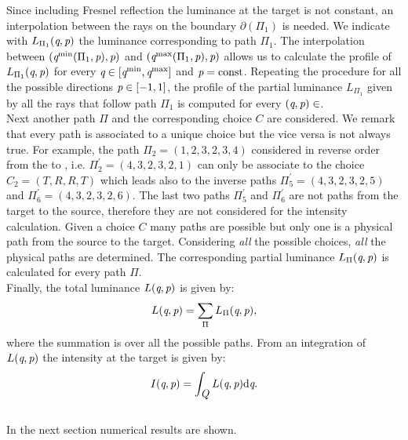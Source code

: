 Since including Fresnel reflection the luminance at the target is not constant, an interpolation between the rays on the boundary $\partial$$(\Pi_1)$ is needed. We indicate with $L_{\Pi_1}(\textit{q},\textit{p})$ the luminance corresponding to path $\Pi_1$. The interpolation between 
$(\textit{q}^{\textrm{min}}(\Pi_1, \textit{p}), \textit{p})$ and $(\textit{q}^{\textrm{max}}(\Pi_1, \textit{p}), \textit{p})$ allows us to calculate the profile of $L_{\Pi_1}(\textit{q},\textit{p})$ for every $\textit{q}\in[\textit{q}^{\textrm{min}}, \textit{q}^{\textrm{max}}]$ and $\textit{p}=\textrm{const}$.
Repeating the procedure for all the possible directions $\textit{p}\in[-1,1]$, the profile of the partial luminance $L_{\Pi_1}$ given by all the rays that follow path $\Pi_1$ is computed for every $(\textit{q}, \textit{p})\in$. 
\\ \indent Next another path $\Pi$ and the corresponding choice $C$ are considered. We remark that every path is associated to a unique choice but the vice versa is not always true. For example, the path $\Pi_2 = (1,2,3,2,3,4)$ considered in reverse order from the  to , i.e. $\Pi_2^{\prime} = (4,3,2,3,2,1)$ can only be associate to the choice $C_2 = (T,R,R,T)$ which leads also to the inverse paths $\Pi_5^{\prime}= (4,3,2,3,2,5)$ and $\Pi_6^{\prime}= (4,3,2,3,2,6)$. The last two paths $\Pi_5^{\prime}$ and $\Pi_6^{\prime}$ are not paths from the target to the source, therefore they are not considered for the intensity calculation. Given a choice $C$ many paths are possible but only one is a physical path from the source to the target. Considering \textit{all} the possible choices, \textit{all} the physical paths are determined. The corresponding partial luminance $L_{\Pi}(\textit{q}, \textit{p})$ is calculated for every path $\Pi$.\\
\indent Finally, the total luminance $L(\textit{q}, \textit{p})$ is given by:
\begin{equation}
L(\textit{q}, \textit{p}) = \sum_{\Pi}L_{\Pi}(\textit{q}, \textit{p}),
\end{equation} 
where the summation is over all the possible paths. 
From an integration of $L(\textit{q}, \textit{p})$ the intensity at the target is given by:
\begin{equation}
I(\textit{q}, \textit{p}) = \int_{\mbox{$\emph{Q}_{\textit{}}$}}L(\textit{q}, \textit{p})\textrm{d}\textit{q}.
\end{equation}
\\ \indent In the next section numerical results are shown.
